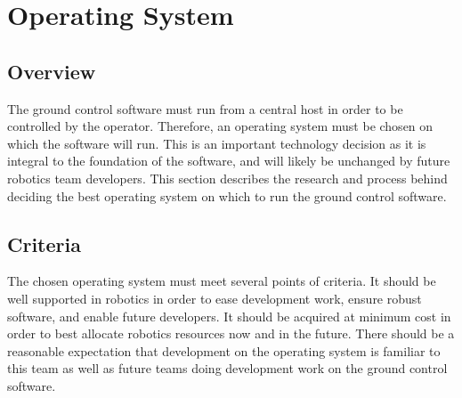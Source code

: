 \documentclass[onecolumn, draftclsnofoot, 10pt, compsoc]{IEEEtran}
\begin{document}
\section{Operating System}\par

\subsection{Overview}
The ground control software must run from a central host in order to be controlled by the operator.
Therefore, an operating system must be chosen on which the software will run.
This is an important technology decision as it is integral to the foundation of the software, and will likely be unchanged by future robotics team developers.
This section describes the research and process behind deciding the best operating system on which to run the ground control software.

\subsection{Criteria}
The chosen operating system must meet several points of criteria.
It should be well supported in robotics in order to ease development work, ensure robust software, and enable future developers.
It should be acquired at minimum cost in order to best allocate robotics resources now and in the future.
There should be a reasonable expectation that development on the operating system is familiar to this team as well as future teams doing development work on the ground control software.
\end{document}
